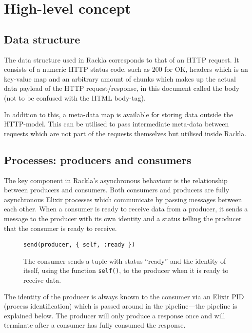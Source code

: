 \documentclass{cslthse-msc}
\begin{document}
\section{High-level concept}

\subsection{Data structure}
The data structure used in Rackla corresponds to that of an HTTP request. It consists of a numeric HTTP status code, such as 200 for OK\cite{http_status_codes}, headers which is an key-value map and an arbitrary amount of chunks which makes up the actual data payload of the HTTP request/response, in this document called the body (not to be confused with the HTML body-tag).

In addition to this, a meta-data map is available for storing data outside the HTTP-model. This can be utilised to pass intermediate meta-data between requests which are not part of the requests themselves but utilised inside Rackla.

\subsection{Processes: producers and consumers}
The key component in Rackla's asynchronous behaviour is the relationship between producers and consumers. Both consumers and producers are fully asynchronous Elixir processes which communicate by passing messages between each other. When a consumer is ready to receive data from a producer, it sends a message to the producer with its own identity and a status telling the producer that the consumer is ready to receive.

\begin{figure}[H]
  \centering
\begin{lstlisting}[breaklines=true,frame=single]
send(producer, { self, :ready })	
\end{lstlisting}
  \caption{The consumer sends a tuple with status \enquote{ready} and the identity of itself, using the function \lstinline{self()}, to the producer when it is ready to receive data.}
\end{figure}

The identity of the producer is always known to the consumer via an Elixir PID (process identification) which is passed around in the pipeline---the pipeline is explained below. The producer will only produce a response once and will terminate after a consumer has fully consumed the response.
\end{document}
